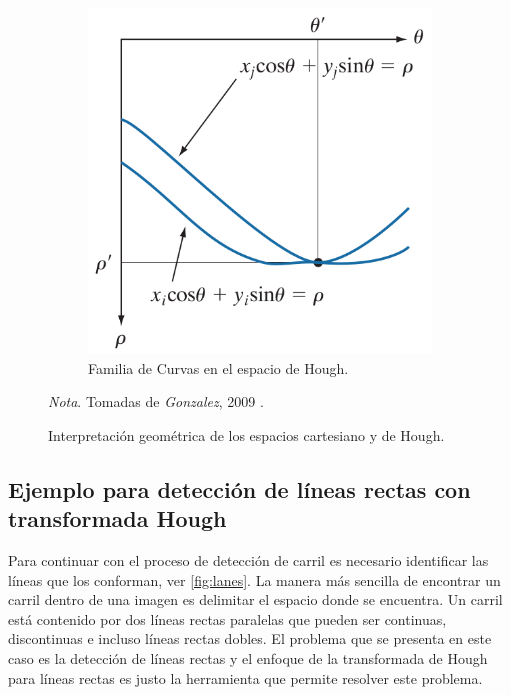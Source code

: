 \begin{figure}
\begin{subfigure}[b]{0.42\textwidth}
         \includegraphics[width=\textwidth]{Figures/Figures_Cap04/hough_space.png}
         \caption{Familia de Curvas en el espacio de Hough.}
         \label{fig:hough_space}
     \end{subfigure}
     
    \caption{Interpretación geométrica de los espacios cartesiano y de Hough.}
    \textit{Nota}. Tomadas de \textit{Gonzalez}, 2009 \cite{gonzalez2009digital}.
    \label{fig:cartesian_hough_space}
\end{figure}

\subsection{Ejemplo para detección de líneas rectas con transformada Hough} \label{sub:ejemplo_para_detección_de_líneas_rectas_con_transformada_Hough}

Para continuar con el proceso de detección de carril es necesario identificar las líneas que los conforman, ver \ref{fig:lanes}. La manera más sencilla de encontrar un carril dentro de una imagen es delimitar el espacio donde se encuentra. Un carril está contenido por dos líneas rectas paralelas que pueden ser continuas, discontinuas e incluso líneas rectas dobles. El problema que se presenta en este caso es la detección de líneas rectas y el enfoque de la transformada de Hough para líneas rectas es justo la herramienta que permite resolver este problema. 

